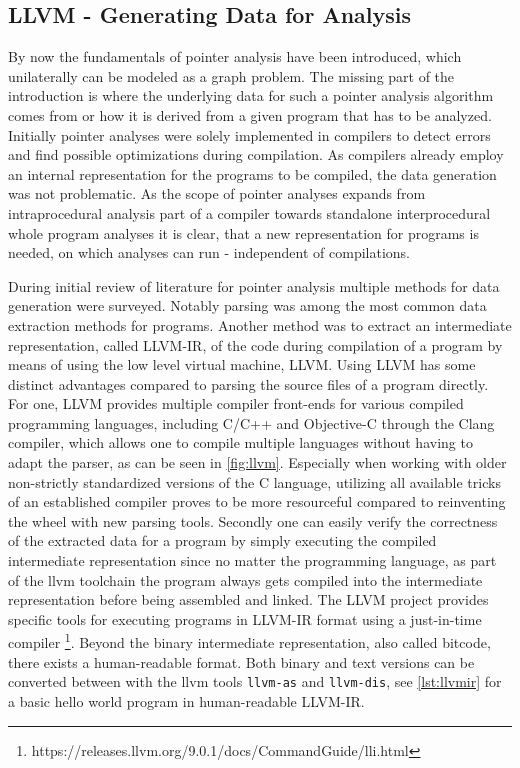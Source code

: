\subsection{LLVM - Generating Data for Analysis}
By now the fundamentals of pointer analysis have been introduced, which unilaterally can be modeled as a graph problem.
The missing part of the introduction is where the underlying data for such a pointer analysis algorithm comes from or how it is derived from a given program that has to be analyzed.
Initially pointer analyses were solely implemented in compilers to detect errors and find possible optimizations during compilation. As compilers already employ an internal representation for the programs to be compiled, the data generation was not problematic.
As the scope of pointer analyses expands from intraprocedural analysis part of a compiler towards standalone interprocedural whole program analyses it is clear, that a new representation for programs is needed, on which analyses can run - independent of compilations.

During initial review of literature for pointer analysis multiple methods for data generation were surveyed. Notably parsing was among the most common data extraction methods for programs. Another method was to extract an intermediate representation, called LLVM-IR, of the code during compilation of a program by means of using the low level virtual machine, LLVM. Using LLVM has some distinct advantages compared to parsing the source files of a program directly.
For one, LLVM provides multiple compiler front-ends for various compiled programming languages, including C/C++ and Objective-C through the Clang compiler, which allows one to compile multiple languages without having to adapt the parser, as can be seen in \autoref{fig:llvm}.
Especially when working with older non-strictly standardized versions of the C language, utilizing all available tricks of an established compiler proves to be more resourceful compared to reinventing the wheel with new parsing tools.
Secondly one can easily verify the correctness of the extracted data for a program by simply executing the compiled intermediate representation since no matter the programming language, as part of the llvm toolchain the program always gets compiled into the intermediate representation before being assembled and linked. The LLVM project provides specific tools for executing programs in LLVM-IR format using a just-in-time compiler \footnote{https://releases.llvm.org/9.0.1/docs/CommandGuide/lli.html}. Beyond the binary intermediate representation, also called bitcode, there exists a human-readable format. Both binary and text versions can be converted between with the llvm tools \verb|llvm-as| and \verb|llvm-dis|, see \autoref{lst:llvmir} for a basic hello world program in human-readable LLVM-IR.

